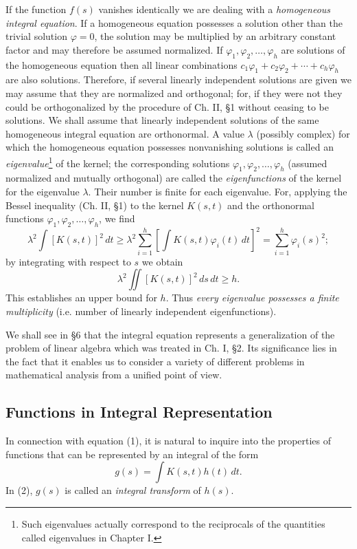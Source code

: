 If the function $f(s)$ vanishes identically we are dealing with a \emph{homogeneous integral equation}. If a homogeneous equation possesses a solution other than the trivial solution $\varphi=0$, the solution may be multiplied by an arbitrary constant factor and may therefore be assumed normalized. If $\varphi_1,\varphi_2,\ldots,\varphi_h$ are solutions of the homogeneous equation then all linear combinations $c_1\varphi_1+c_2\varphi_2+\cdots+c_h\varphi_h$ are also solutions. Therefore, if several linearly independent solutions are given we may assume that they are normalized and orthogonal; for, if they were not they could be orthogonalized by the procedure of Ch. II, \S1 without ceasing to be solutions. We shall assume that linearly independent solutions of the same homogeneous integral equation are orthonormal. A value $\lambda$ (possibly complex) for which the homogeneous equation possesses nonvanishing solutions is called an \emph{eigenvalue}\footnote{Such eigenvalues actually correspond to the reciprocals of the quantities called eigenvalues in Chapter I.} of the kernel; the corresponding solutions $\varphi_1,\varphi_2,\ldots,\varphi_h$ (assumed normalized and mutually orthogonal) are called the \emph{eigenfunctions} of the kernel for the eigenvalue $\lambda$. Their number is finite for each eigenvalue. For, applying the Bessel inequality (Ch. II, \S1) to the kernel $K(s,t)$ and the orthonormal functions $\varphi_1,\varphi_2,\ldots,\varphi_h$, we find
\[
\lambda^2\int [K(s,t)]^2\,dt
\ge
\lambda^2\sum_{i=1}^{h}\left[\int K(s,t)\varphi_i(t)\,dt\right]^2
=
\sum_{i=1}^{h}\varphi_i(s)^2;
\]
by integrating with respect to $s$ we obtain
\[
\lambda^2\iint [K(s,t)]^2\,ds\,dt\ge h.
\]
This establishes an upper bound for $h$. Thus \emph{every eigenvalue possesses a finite multiplicity} (i.e. number of linearly independent eigenfunctions).

We shall see in \S6 that the integral equation represents a generalization of the problem of linear algebra which was treated in Ch. I, \S2. Its significance lies in the fact that it enables us to consider a variety of different problems in mathematical analysis from a unified point of view.

\subsection{Functions in Integral Representation}
In connection with equation (1), it is natural to inquire into the properties of functions that can be represented by an integral of the form
\begin{equation}\tag{2}
g(s)=\int K(s,t)h(t)\,dt.
\end{equation}
In (2), $g(s)$ is called an \emph{integral transform} of $h(s)$.

